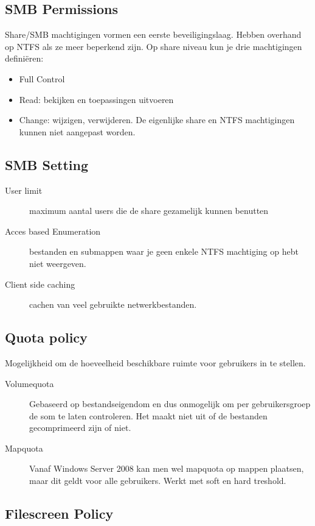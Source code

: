 \subsection{SMB Permissions}

Share/SMB machtigingen vormen een eerste beveiligingslaag. Hebben overhand op
NTFS als ze meer beperkend zijn. Op share niveau kun je drie machtigingen
definiëren:
\begin{itemize}
	\item Full Control
	\item Read: bekijken en toepassingen uitvoeren
	\item Change: wijzigen, verwijderen. De eigenlijke share en NTFS
		machtigingen kunnen niet aangepast worden.
\end{itemize}

\subsection{SMB Setting}

\begin{description}
	\item[User limit] maximum aantal users die de share gezamelijk kunnen
		benutten
	\item[Acces based Enumeration] bestanden en submappen waar je geen
		enkele NTFS machtiging op hebt niet weergeven.
	\item[Client side caching] cachen van veel gebruikte netwerkbestanden.
\end{description}

\subsection{Quota policy}

Mogelijkheid om de hoeveelheid beschikbare ruimte voor gebruikers in te stellen.
\begin{description}
	\item[Volumequota] Gebaseerd op bestandseigendom en dus onmogelijk om
		per gebruikersgroep de som te laten controleren. 
		Het maakt niet uit of de bestanden gecomprimeerd zijn of niet.
	\item[Mapquota] Vanaf Windows Server 2008 kan men wel mapquota op mappen
		plaatsen, maar dit geldt voor alle gebruikers. Werkt met soft en
		hard treshold.
\end{description}

\subsection{Filescreen Policy}

